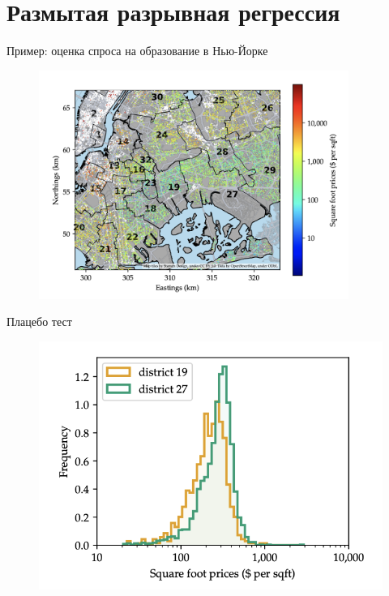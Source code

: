 

\section{Размытая разрывная регрессия}



\begin{frame}{Пример: оценка спроса на образование в Нью-Йорке} %

\begin{figure}
    \centering
    \includegraphics[width=0.9\textwidth]{Images/ny_schools_map.png}
\end{figure}

\end{frame}

\begin{frame}{Плацебо тест}


\begin{figure}
    \centering
    \includegraphics[width=\textwidth]{Images/placebo_schools_ny.png}
\end{figure}

\end{frame}



